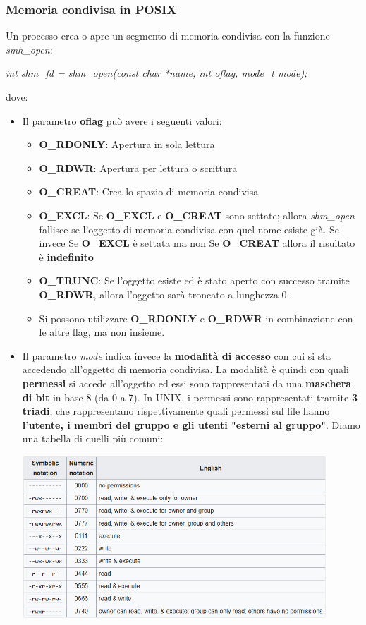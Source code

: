 \documentclass[12pt]{article}
\begin{document}
\subsubsection{Memoria condivisa in POSIX}
Un processo crea o apre un segmento di memoria condivisa con la funzione \textit{smh\_open}:
\begin{center}
    \textit{int shm\_fd = shm\_open(const char *name, int oflag, mode\_t mode);}
\end{center}
dove:
\begin{itemize}
    \item Il parametro \textbf{oflag} può avere i seguenti valori:
    \begin{itemize}
        \item \textbf{O\_RDONLY}: Apertura in sola lettura
        \item \textbf{O\_RDWR}: Apertura per lettura o scrittura
        \item \textbf{O\_CREAT}: Crea lo spazio di memoria condivisa
        \item \textbf{O\_EXCL}: Se \textbf{O\_EXCL} e \textbf{O\_CREAT} sono settate; allora \textit{shm\_open} fallisce se l'oggetto di memoria condivisa con quel nome esiste già. Se invece Se \textbf{O\_EXCL} è settata ma non Se \textbf{O\_CREAT} allora il risultato è \textbf{indefinito}
        \item \textbf{O\_TRUNC}: Se l'oggetto esiste ed è stato aperto con successo tramite \textbf{O\_RDWR}, allora l'oggetto sarà troncato a lunghezza 0.
        \item Si possono utilizzare \textbf{O\_RDONLY} e \textbf{O\_RDWR} in combinazione con le altre flag, ma non insieme.
    \end{itemize}
    \item Il parametro \textit{mode} indica invece la \textbf{modalità di accesso} con cui si sta accedendo all'oggetto di memoria condivisa.
    La modalità è quindi con quali \textbf{permessi} si accede all'oggetto ed essi sono rappresentati da una \textbf{maschera di bit} in base 8 (da 0 a 7).
    In UNIX, i permessi sono rappresentati tramite \textbf{3 triadi}, che rappresentano rispettivamente quali permessi sul file hanno \textbf{l'utente, i membri del gruppo e gli utenti "esterni al gruppo"}.
    Diamo una tabella di quelli più comuni:
    \begin{center}
        \includegraphics[width = 0.90\textwidth]{Images/14.PNG}
    \end{center}
\end{itemize}
\end{document}
